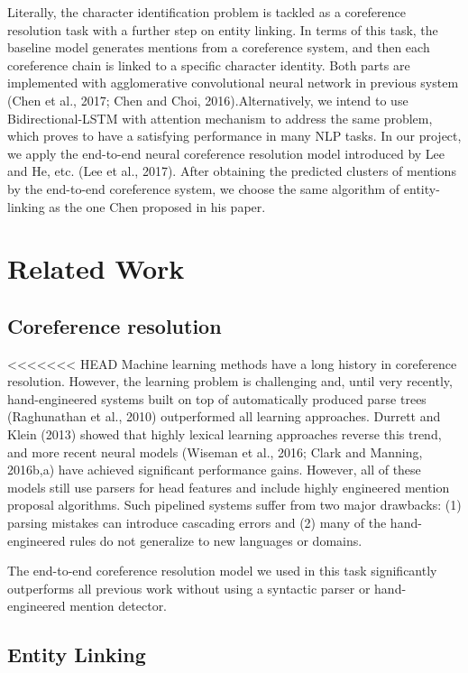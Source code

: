 \documentclass[11pt]{article}
\begin{document}
Literally, the character identification problem is tackled as a coreference resolution task with a further step on entity linking. In terms of this task, the baseline model generates mentions from a coreference system, and then each coreference chain is linked to a specific character identity. Both parts are implemented with agglomerative convolutional neural network in previous system (Chen et al., 2017; Chen and Choi, 2016).Alternatively, we intend to use Bidirectional-LSTM with attention mechanism to address the same problem, which proves to have a satisfying performance in many NLP tasks. In our project, we apply the end-to-end neural coreference resolution model introduced by Lee and He, etc. (Lee et al., 2017). After obtaining the predicted clusters of mentions by the end-to-end coreference system, we choose the same algorithm of entity-linking as the one Chen proposed in his paper.

\section{Related Work}
\subsection{Coreference resolution}
<<<<<<< HEAD
Machine learning methods have a long history in coreference resolution. However, the learning problem is challenging and, until very recently, hand-engineered systems built on top of automatically produced parse trees (Raghunathan et al., 2010) outperformed all learning approaches. Durrett and Klein (2013) showed that highly lexical learning approaches reverse this trend, and more recent neural models (Wiseman et al., 2016; Clark and Manning, 2016b,a) have achieved significant performance gains. However, all of these models still use parsers for head features and include highly engineered mention proposal algorithms. Such pipelined systems suffer from two major drawbacks: (1) parsing mistakes can introduce cascading errors and (2) many of the hand-engineered rules do not generalize to new languages or domains.  

The end-to-end coreference resolution model we used in this task significantly outperforms all previous work without using a syntactic parser or hand-engineered mention detector.

\subsection{Entity Linking}
\end{document}
